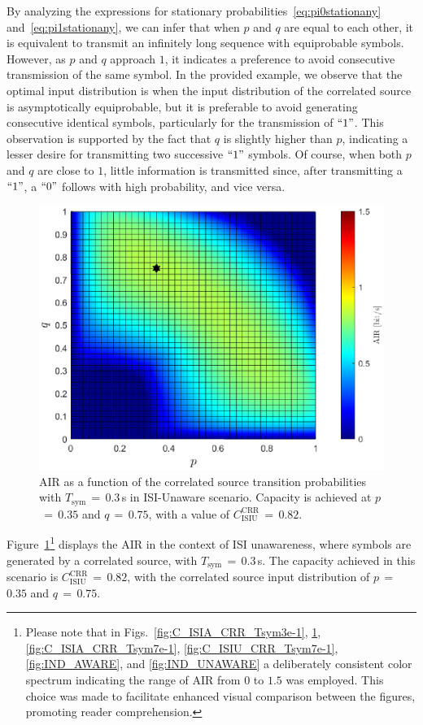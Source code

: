\documentclass[journal]{IEEEtranTCOM}
\begin{document}
By analyzing the expressions for stationary probabilities~\eqref{eq:pi0stationany} and~\eqref{eq:pi1stationany}, we can infer that when $p$ and $q$ are equal to each other, it is equivalent to transmit an infinitely long sequence with equiprobable symbols. However, as $p$ and $q$ approach $1$, it indicates a preference to avoid consecutive transmission of the same symbol. In the provided example, we observe that the optimal input distribution is when the input distribution of the correlated source is asymptotically equiprobable, but it is preferable to avoid generating consecutive identical symbols, particularly for the transmission of $``1"$. This observation is supported by the fact that $q$ is slightly higher than $p$, indicating a lesser desire for transmitting two successive $``1"$ symbols. Of course, when both $p$ and $q$ are close to $1$, little information is transmitted since, after transmitting a $``1"$, a $``0"$ follows with high probability, and vice versa.
\begin{figure}
    \centering
    \includegraphics[width=1\linewidth]{Figures/ISIU_CRR_Tsym3e-1.eps}
    \caption{AIR as a function of the correlated source transition probabilities with $T_{\mathrm{sym}}$$\,=\,$$0.3$\,s in ISI-Unaware scenario. Capacity is achieved at $p$$\,=\,$$0.35$ and $q$$\,=\,$$0.75$, with a value of $C_{\text{ISIU}}^{\text{CRR}}$$\,=\,$$0.82$.}
    \label{fig:C_ISIU_CRR_Tsym3e-1}
\end{figure}
\par Figure~\ref{fig:C_ISIU_CRR_Tsym3e-1}\footnote{Please note that in Figs.~\ref{fig:C_ISIA_CRR_Tsym3e-1}, \ref{fig:C_ISIU_CRR_Tsym3e-1}, \ref{fig:C_ISIA_CRR_Tsym7e-1}, \ref{fig:C_ISIU_CRR_Tsym7e-1}, \ref{fig:IND_AWARE}, and \ref{fig:IND_UNAWARE} a deliberately consistent color spectrum indicating the range of AIR from $0$ to $1.5$ was employed. This choice was made to facilitate enhanced visual comparison between the figures, promoting reader comprehension.} displays the AIR in the context of ISI unawareness, where symbols are generated by a correlated source, with $T_{\mathrm{sym}}$$\,=\,$$0.3$\,s. The capacity achieved in this scenario is $C_{\text{ISIU}}^{\text{CRR}}$$\,=\,$$0.82$, with the correlated source input distribution of $p$$\,=\,$$0.35$ and $q$$\,=\,$$0.75$.
\end{document}
